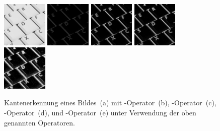 \begin{figure}[H]
  \label{fig:edge-detection}
  \centering
  \includegraphics[width=0.1925\textwidth]{img/basics/edge-detection/original}
  \includegraphics[width=0.1925\textwidth]{img/basics/edge-detection/roberts}
  \includegraphics[width=0.1925\textwidth]{img/basics/edge-detection/prewitt}
  \includegraphics[width=0.1925\textwidth]{img/basics/edge-detection/sobel}
  \includegraphics[width=0.1925\textwidth]{img/basics/edge-detection/scharr}
  \caption[Kantenerkennung]{Kantenerkennung eines Bildes\protect\footnotemark~(a) mit -Operator~(b), -Operator~(c), -Operator~(d), und -Operator~(e) unter Verwendung der oben genannten Operatoren.}
\end{figure}


